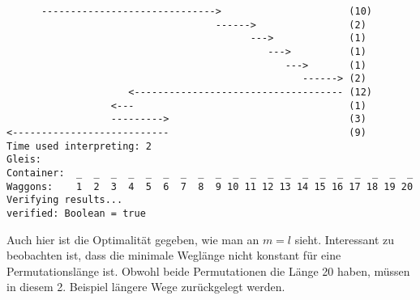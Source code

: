 \begin{lstlisting}
      ------------------------------>                      (10)
                                    ------>                (2)
                                          --->             (1)
                                             --->          (1)
                                                --->       (1)
                                                   ------> (2)
                     <------------------------------------ (12)
                  <---                                     (1)
                  --------->                               (3)
<---------------------------                               (9)
Time used interpreting: 2
Gleis: 
Container:  _  _  _  _  _  _  _  _  _  _  _  _  _  _  _  _  _  _  _  _
Waggons:    1  2  3  4  5  6  7  8  9 10 11 12 13 14 15 16 17 18 19 20
Verifying results...
verified: Boolean = true
\end{lstlisting}
Auch hier ist die Optimalität gegeben, wie man an $m = l$ sieht.
Interessant zu beobachten ist, dass die minimale Weglänge nicht konstant für eine Permutationslänge ist.
Obwohl beide Permutationen die Länge 20 haben, müssen in diesem 2. Beispiel längere Wege zurückgelegt werden.
